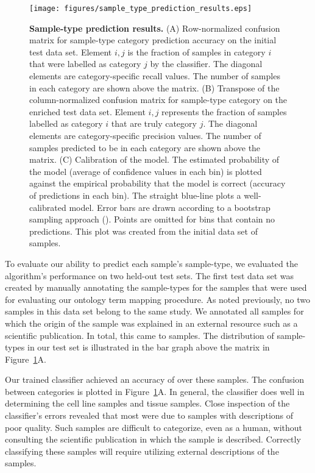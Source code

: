 \begin{figure}[!tpb]
\centerline{\texttt{[image: figures/sample\_type\_prediction\_results.eps]}}
\caption{\textbf{Sample-type prediction results.} (A) Row-normalized confusion matrix for sample-type category prediction accuracy on the initial test data set. Element $i,j$ is the fraction of samples in category $i$ that were labelled as category $j$ by the classifier. The diagonal elements are category-specific recall values.  The number of samples in each category are shown above the matrix. (B) Transpose of the column-normalized confusion matrix for sample-type category on the enriched test data set.  Element $i, j$ represents the fraction of samples labelled as category $i$ that are truly category $j$. The diagonal elements are category-specific precision values. The number of samples predicted to be in each category are shown above the matrix.   (C) Calibration of the model.  The estimated probability of the model (average of confidence values in each bin) is plotted against the empirical probability that the model is correct (accuracy of predictions in each bin). The straight blue-line plots a well-calibrated model. Error bars are drawn according to a bootstrap sampling approach (\citealp{Brocker}). Points are omitted for bins that contain no predictions. This plot was created from the initial data set of \TestSetSize{} samples.}
\label{fig:sample_type}
\end{figure}

To evaluate our ability to predict each sample's sample-type, we evaluated the algorithm's performance on two held-out test sets. The first test data set was created by manually annotating the sample-types for the \TestSetSize{} samples that were used for evaluating our ontology term mapping procedure.  As noted previously, no two samples in this data set belong to the same study.   We annotated all samples for which the origin of the sample was explained in an external resource such as a scientific publication. In total, this came to \NonEnrichedSampleTypeTestSetSize{} samples.  The distribution of sample-types in our test set is illustrated in the bar graph above the matrix in Figure~\ref{fig:sample_type}A.

Our trained classifier achieved an accuracy of \SampleTypeOverallAccuracy{} over these samples.  The confusion between categories is plotted in Figure~\ref{fig:sample_type}A.  In general, the classifier does well in determining the cell line samples and tissue samples.  Close inspection of the classifier's errors revealed that most were due to samples with descriptions of poor quality.  Such samples are difficult to categorize, even as a human, without consulting the scientific publication in which the sample is described. Correctly classifying these samples will require utilizing external descriptions of the samples. 

